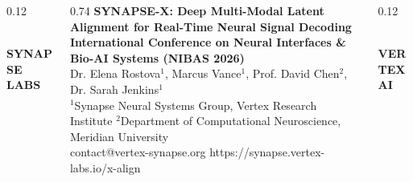 \documentclass[final]{beamer}
\begin{document}
\begin{frame}[t]

\begin{tcolorbox}[
  enhanced,
  colback=primary,
  colframe=primary,
  arc=0pt,
  boxrule=0pt,
  left=24pt, right=24pt, top=20pt, bottom=20pt
]
\begin{columns}[c]
  \begin{column}{0.12\textwidth}
    \centering
    \\[4pt]
    {\color{white}\bfseries\small SYNAPSE LABS}
  \end{column}
  
  \begin{column}{0.74\textwidth}
    \centering
    {\color{highlight}\bfseries\fontsize{38}{44}\selectfont SYNAPSE-X: Deep Multi-Modal Latent Alignment for Real-Time Neural Signal Decoding}\\[12pt]
    {\color{white}\Large\bfseries International Conference on Neural Interfaces \& Bio-AI Systems (NIBAS 2026)}\\[14pt]
    {\color{white}\large Dr. Elena Rostova$^1$, Marcus Vance$^1$, Prof. David Chen$^2$, Dr. Sarah Jenkins$^1$}\\[6pt]
    {\color{accent!30!white}\normalsize $^1$Synapse Neural Systems Group, Vertex Research Institute \quad $^2$Department of Computational Neuroscience, Meridian University}\\[4pt]
    {\color{white}\small \faEnvelope{} contact@vertex-synapse.org \quad \faGlobe{} https://synapse.vertex-labs.io/x-align}
  \end{column}
  
  \begin{column}{0.12\textwidth}
    \centering
    \\[4pt]
    {\color{white}\bfseries\small VERTEX AI}
  \end{column}
\end{columns}
\end{tcolorbox}


\end{frame}
\end{document}
